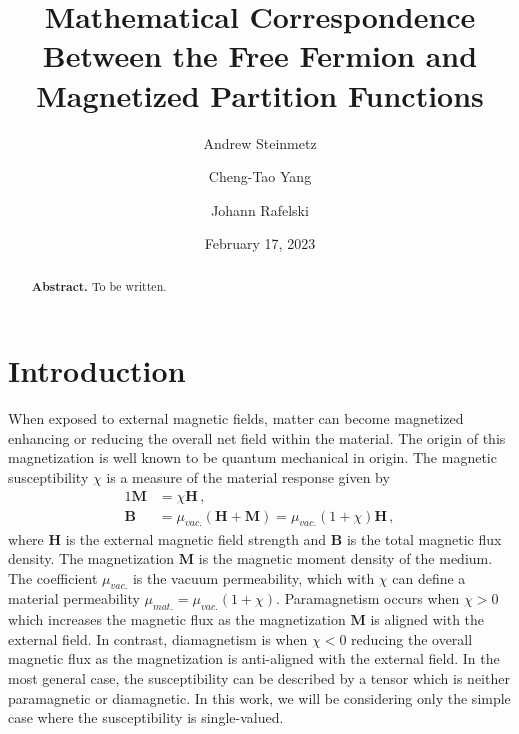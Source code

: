 \documentclass[
aps,
pra,
showpacs,
preprintnumbers,
amsmath,
amssymb,
footinbib
]{revtex4-2}
\begin{document}

\title{Mathematical Correspondence Between the Free Fermion and Magnetized Partition Functions}
\author{Andrew Steinmetz}
\author{Cheng-Tao Yang}
\author{Johann Rafelski}
\date{February 17, 2023}

\begin{abstract}
\noindent\textbf{Abstract.} To be written. 
\end{abstract}
\maketitle

\section{Introduction}
\noindent When exposed to external magnetic fields, matter can become magnetized enhancing or reducing the overall net field within the material. The origin of this magnetization is well known to be quantum mechanical in origin. The magnetic susceptibility $\chi$ is a measure of the material response given by
\begin{alignat}{1}
  \label{CHIeq01} \textbf{M}&=\chi\textbf{H}\,,\\
  \label{CHIeq02} \textbf{B}&=\mu_{vac.}\left(\textbf{H}+\textbf{M}\right)=\mu_{vac.}\left(1+\chi\right)\textbf{H}\,,
\end{alignat}
where $\textbf{H}$ is the external magnetic field strength and $\textbf{B}$ is the total magnetic flux density. The magnetization $\textbf{M}$ is the magnetic moment density of the medium. The coefficient $\mu_{vac.}$ is the vacuum permeability, which with $\chi$ can define a material permeability $\mu_{mat.}=\mu_{vac.}(1+\chi)$. Paramagnetism occurs when $\chi>0$ which increases the magnetic flux as the magnetization $\textbf{M}$ is aligned with the external field. In contrast, diamagnetism is when $\chi<0$ reducing the overall magnetic flux as the magnetization is anti-aligned with the external field. In the most general case, the susceptibility can be described by a tensor which is neither paramagnetic or diamagnetic. In this work, we will be considering only the simple case where the susceptibility is single-valued.
\end{document}
